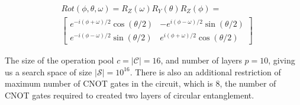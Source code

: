 \documentclass{ieeeaccess}
\begin{document}
\begin{equation}
\begin{split}
    & Rot(\phi, \theta, \omega)=R_Z(\omega) R_Y(\theta) R_Z(\phi)= \\
    & \left[\begin{array}{cc}
e^{-i(\phi+\omega) / 2} \cos (\theta / 2) & -e^{i(\phi-\omega) / 2} \sin (\theta / 2) \\
e^{-i(\phi-\omega) / 2} \sin (\theta / 2) & e^{i(\phi+\omega) / 2} \cos (\theta / 2)
\end{array}\right]
\end{split}
\end{equation}

The size of the operation pool $c = \vert \mathcal{C}\vert = 16$, and number of layers $p = 10$, giving us a search space of size $\vert \mathcal{S} \vert = 10^{16}$. There is also an additional restriction of maximum number of CNOT gates in the circuit, which is 8, the number of CNOT gates required to created two layers of circular entanglement.
\end{document}
